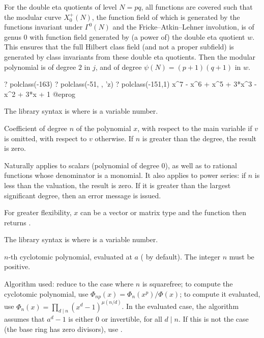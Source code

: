 For the double eta quotients of level $N = p q$, all functions are covered
such that the modular curve $X_0^+ (N)$, the function field of which is
generated by the functions invariant under $\Gamma^0 (N)$ and the
Fricke--Atkin--Lehner involution, is of genus $0$ with function field
generated by (a power of) the double eta quotient $w$.
This ensures that the full Hilbert class field (and not a proper subfield)
is generated by class invariants from these double eta quotients.
Then the modular polynomial is of degree $2$ in $j$, and
of degree $\psi (N) = (p+1)(q+1)$ in $w$.

\bprog
? polclass(-163)
? polclass(-51, , 'z)
? polclass(-151,1)
x^7 - x^6 + x^5 + 3*x^3 - x^2 + 3*x + 1
@eprog

The library syntax is  where  is a variable number.

\label{se:polcoeff}
Coefficient of degree $n$ of the polynomial $x$, with respect to the
main variable if $v$ is omitted, with respect to $v$ otherwise.  If $n$
is greater than the degree, the result is zero.

Naturally applies to scalars (polynomial of degree $0$), as well as to
rational functions whose denominator is a monomial.
It also applies to power series: if $n$ is less than the valuation, the result
is zero. If it is greater than the largest significant degree, then an error
message is issued.

 For greater flexibility, $x$ can be a vector or matrix type and the
 function then returns .

The library syntax is  where  is a variable number.

\label{se:polcyclo}
$n$-th cyclotomic polynomial, evaluated at $a$ ( by default). The
integer $n$ must be positive.

Algorithm used: reduce to the case where $n$ is squarefree; to compute the
cyclotomic polynomial, use $\Phi_{np}(x)=\Phi_n(x^p)/\Phi(x)$; to compute
it evaluated, use $\Phi_n(x) = \prod_{d\mid n} (x^d-1)^{\mu(n/d)}$. In the
evaluated case, the algorithm assumes that $a^d - 1$ is either $0$ or
invertible, for all $d\mid n$. If this is not the case (the base ring has
zero divisors), use .

